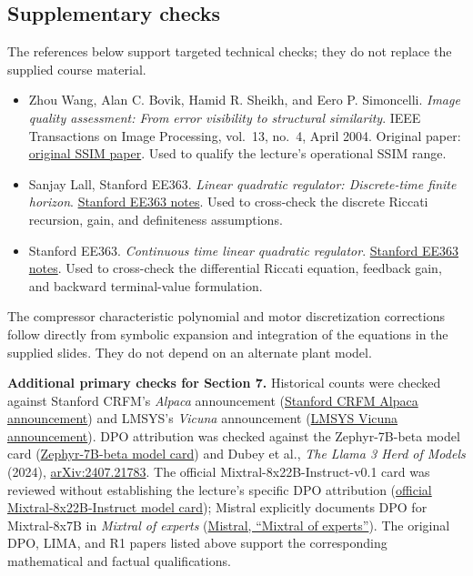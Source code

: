\documentclass[11pt,a4paper]{article}
\numberwithin{equation}{section}
\numberwithin{figure}{section}
\numberwithin{table}{section}
\begin{document}
\subsection{Supplementary checks}
The references below support targeted technical checks; they do not replace the supplied course material.
\begin{itemize}
\item Zhou Wang, Alan C. Bovik, Hamid R. Sheikh, and Eero P. Simoncelli. \emph{Image quality assessment: From error visibility to structural similarity}. IEEE Transactions on Image Processing, vol.\ 13, no.\ 4, April 2004. Original paper: \href{https://www.cns.nyu.edu/pub/eero/wang03-reprint.pdf}{original SSIM paper}. Used to qualify the lecture's operational SSIM range.
\item Sanjay Lall, Stanford EE363. \emph{Linear quadratic regulator: Discrete-time finite horizon}. \href{https://ee363.stanford.edu/lectures/015_dlqr.pdf}{Stanford EE363 notes}. Used to cross-check the discrete Riccati recursion, gain, and definiteness assumptions.
\item Stanford EE363. \emph{Continuous time linear quadratic regulator}. \href{https://ee363.stanford.edu/lectures/018_clqr.pdf}{Stanford EE363 notes}. Used to cross-check the differential Riccati equation, feedback gain, and backward terminal-value formulation.
\end{itemize}
The compressor characteristic polynomial and motor discretization corrections follow directly from symbolic expansion and integration of the equations in the supplied slides. They do not depend on an alternate plant model.

\textbf{Additional primary checks for Section 7.} Historical counts were checked against Stanford CRFM's \emph{Alpaca} announcement (\href{https://crfm.stanford.edu/2023/03/13/alpaca.html}{Stanford CRFM Alpaca announcement}) and LMSYS's \emph{Vicuna} announcement (\href{https://lmsys.org/blog/2023-03-30-vicuna/}{LMSYS Vicuna announcement}). DPO attribution was checked against the Zephyr-7B-beta model card (\href{https://huggingface.co/HuggingFaceH4/zephyr-7b-beta}{Zephyr-7B-beta model card}) and Dubey et al., \emph{The Llama 3 Herd of Models} (2024), \href{https://arxiv.org/abs/2407.21783}{arXiv:2407.21783}. The official Mixtral-8x22B-Instruct-v0.1 card was reviewed without establishing the lecture's specific DPO attribution (\href{https://huggingface.co/mistralai/Mixtral-8x22B-Instruct-v0.1}{official Mixtral-8x22B-Instruct model card}); Mistral explicitly documents DPO for Mixtral-8x7B in \emph{Mixtral of experts} (\href{https://mistral.ai/news/mixtral-of-experts/}{Mistral, ``Mixtral of experts''}). The original DPO, LIMA, and R1 papers listed above support the corresponding mathematical and factual qualifications.
\end{document}
